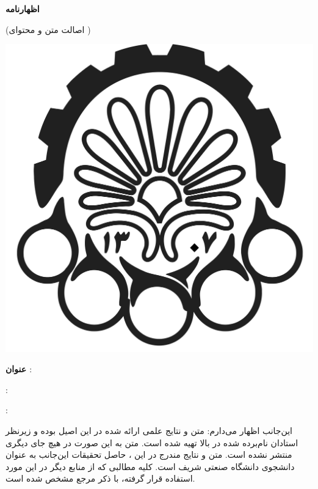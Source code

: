 
{\parindent0pt

\begin{center}
{\large\bf اظهارنامه}

{\small(اصالت متن و محتوای \ThesisType{} \ThesisDegree)}
\end{center}
\vspace{-6em}
\includegraphics[scale=0.15]{front/template/images/logo.png}
\vspace{1em}

\textbf{عنوان ‌\ThesisType}: \ThesisTitle

\vspace{.1em}
\begin{multicols}{2}
	{: \ThesisSupervisor}
	
	{: \ThesisAdvisor}
\end{multicols}

\vspace{0.2em}
این‌جانب {\ThesisAuthor} اظهار می‌دارم:
 متن و نتایج علمی ارائه شده در این \ThesisType{} اصیل بوده و زیرنظر استادان نام‌برده ‌شده در بالا تهیه شده است.
 متن \ThesisType{} به این صورت در هیچ جای دیگری منتشر نشده است.
 متن و نتایج مندرج در این \ThesisType، حاصل تحقیقات این‌جانب به عنوان دانشجوی \ThesisDegree{} دانشگاه صنعتی شریف است.
 کلیه مطالبی که از منابع دیگر در این \ThesisType{} مورد استفاده قرار گرفته، با ذکر مرجع مشخص شده است.

}
